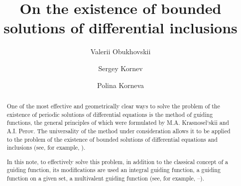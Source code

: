 \begin{englishtitle} %
\title{On the existence of bounded solutions of differential inclusions}
\author{Valerii Obukhovskii \and  Sergey Kornev \and  Polina Korneva  
}

\maketitle

\begin{abstract}
One of the most effective and geometrically clear ways to solve the problem of the existence of periodic solutions of differential equations is the method of guiding functions, the general principles of which were formulated by M.A. Krasnosel`skii and A.I. Perov. The universality of the method under consideration allows it to be applied to the problem of the existence of bounded solutions of differential equations and inclusions (see, for example, \cite{k_kr}).

In this note, to effectively solve this problem, in addition to the classical concept of a guiding function, its modifications are used an integral guiding function, a guiding function on a given set, a multivalent guiding function (see, for example, \cite{k_b_g_m_o}--\cite{k_k_o_z_2}).

\end{abstract}
\end{englishtitle}



\iffalse
\documentclass[12pt]{llncs}


\usepackage{iftex}

\ifPDFTeX
\usepackage[T2A]{fontenc}
\usepackage[utf8]{inputenc} %
\usepackage[english,russian]{babel}
\fi

\usepackage{todonotes}

\usepackage[russian]{nla}



\fi
%

